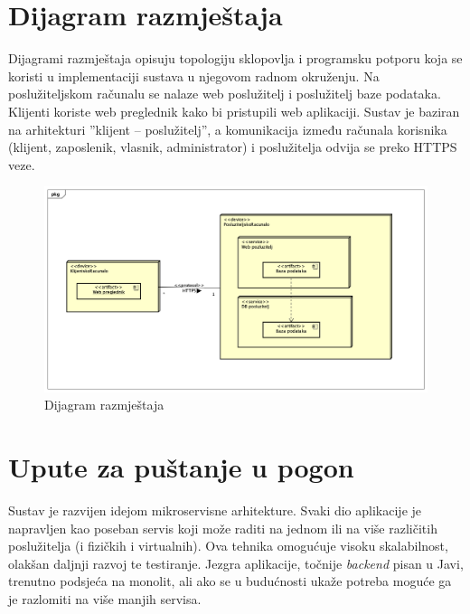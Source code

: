 			\eject 
		
		
		\section{Dijagram razmještaja}
			
			Dijagrami razmještaja opisuju topologiju sklopovlja i programsku potporu koja se koristi u implementaciji sustava u njegovom radnom okruženju. Na poslužiteljskom računalu se nalaze web poslužitelj i poslužitelj baze podataka. Klijenti koriste web preglednik kako bi pristupili web aplikaciji. Sustav je baziran na arhitekturi ”klijent – poslužitelj”, a komunikacija između računala korisnika (klijent, zaposlenik, vlasnik, administrator) i poslužitelja odvija se preko HTTPS veze.
			
			\begin{figure}[H]
					\includegraphics[scale=0.4]{figures/Deployment Diagram0.PNG}
					\centering
					\caption{Dijagram razmještaja}
					\label{fig:Dijagram razmještaja}
				\end{figure}
			\eject 
		
		\section{Upute za puštanje u pogon}
		
	
		
		Sustav je razvijen idejom mikroservisne arhitekture. Svaki dio aplikacije je napravljen kao poseban servis koji može raditi na jednom ili na više različitih poslužitelja (i fizičkih i virtualnih). Ova tehnika omogućuje visoku skalabilnost, olakšan daljnji razvoj te testiranje. Jezgra aplikacije, točnije  \textit{backend} pisan u Javi, trenutno podsjeća na monolit, ali ako se u budućnosti ukaže potreba moguće ga je razlomiti na više manjih servisa. 

